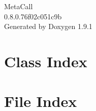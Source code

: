 \let\mypdfximage\pdfximage\def\pdfximage{\immediate\mypdfximage}\documentclass[twoside]{book}
\newcommand{\+}{\discretionary{\mbox{\scriptsize$\hookleftarrow$}}{}{}}
\newcommand{\clearemptydoublepage}{%
  \newpage{\pagestyle{empty}\cleardoublepage}%
}
\begin{document}
\raggedbottom

\begin{titlepage}
\vspace*{7cm}
\begin{center}%
{\Large Meta\+Call \\[1ex]\large 0.\+8.\+0.\+76f02c051c9b }\\
\vspace*{1cm}
{\large Generated by Doxygen 1.9.1}\\
\end{center}
\end{titlepage}
\clearemptydoublepage
{}
\tableofcontents
\clearemptydoublepage
{}

\chapter{Class Index}

\chapter{File Index}

\end{document}
